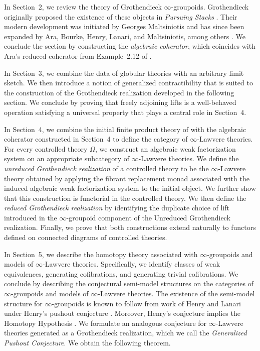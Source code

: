\documentclass{tac}
\begin{document}
In Section~2, we review the theory of Grothendieck $\infty$-groupoids. Grothendieck originally proposed the existence of these objects in \emph{Pursuing Stacks} \cite{Gr1}. Their modern development was initiated by Georges Maltsiniotis and has since been expanded by Ara, Bourke, Henry, Lanari, and Maltsiniotis, among others \cite{Dim1,Henry2016,HenLan,LanE,Geo2,Bo2}. We conclude the section by constructing the \emph{algebraic coherator}, which coincides with Ara's reduced coherator from Example~2.12 of \cite{Dim1}.

In Section~3, we combine the data of globular theories with an arbitrary limit sketch. We then introduce a notion of generalized contractibility that is suited to the construction of the Grothendieck realization developed in the following section. We conclude by proving that freely adjoining lifts is a well-behaved operation satisfying a universal property that plays a central role in Section~4.

In Section~4, we combine the initial finite product theory of \cite{Law2} with the algebraic coherator constructed in Section~4 to define the category of $\infty$-Lawvere theories. For every controlled theory $\Omega$, we construct an algebraic weak factorization system on an appropriate subcategory of $\infty$-Lawvere theories. We define the \emph{unreduced Grothendieck realization} of a controlled theory to be the $\infty$-Lawvere theory obtained by applying the fibrant replacement monad associated with the induced algebraic weak factorization system to the initial object. We further show that this construction is functorial in the controlled theory. We then define the \emph{reduced Grothendieck realization} by identifying the duplicate choice of lift introduced in the $\infty$-groupoid component of the Unreduced Grothendieck realization. Finally, we prove that both constructions extend naturally to functors defined on connected diagrams of controlled theories.

In Section~5, we describe the homotopy theory associated with $\infty$-groupoids and models of $\infty$-Lawvere theories. Specifically, we identify classes of weak equivalences, generating cofibrations, and generating trivial cofibrations. We conclude by describing the conjectural semi-model structures on the categories of $\infty$-groupoids and models of $\infty$-Lawvere theories. The existence of the semi-model structure for $\infty$-groupoids is known to follow from work of Henry and Lanari under Henry's pushout conjecture \cite{Henry2016,HenLan,LanE}. Moreover, Henry's conjecture implies the Homotopy Hypothesis \cite{Henry2016}. We formulate an analogous conjecture for $\infty$-Lawvere theories generated as a Grothendieck realization, which we call the \emph{Generalized Pushout Conjecture}. We obtain the following theorem.
\end{document}

